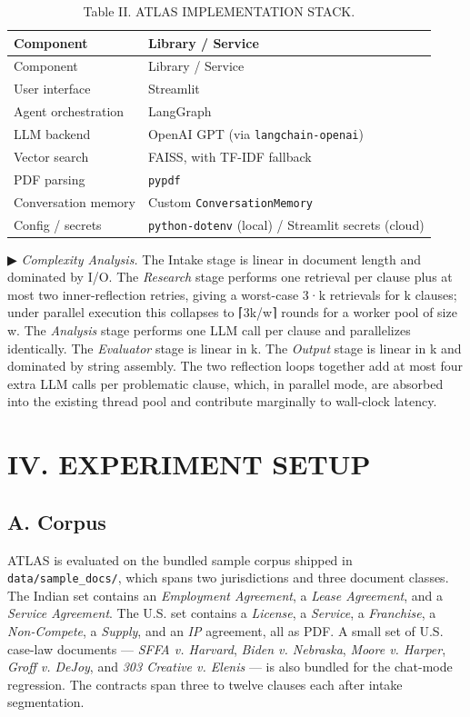 \documentclass[
  twocolumn]{article}
\begin{document}
\begin{longtable}[]{@{}ll@{}}
\caption{Table II. ATLAS IMPLEMENTATION STACK.}\tabularnewline
\toprule\noalign{}
Component & Library / Service \\
\midrule\noalign{}
\endfirsthead
\toprule\noalign{}
Component & Library / Service \\
\midrule\noalign{}
\endhead
\bottomrule\noalign{}
\endlastfoot
User interface & Streamlit \\
Agent orchestration & LangGraph \\
LLM backend & OpenAI GPT (via \texttt{langchain-openai}) \\
Vector search & FAISS, with TF-IDF fallback \\
PDF parsing & \texttt{pypdf} \\
Conversation memory & Custom \texttt{ConversationMemory} \\
Config / secrets & \texttt{python-dotenv} (local) / Streamlit secrets
(cloud) \\
\end{longtable}

▶ \emph{Complexity Analysis.} The Intake stage is linear in document
length and dominated by I/O. The \emph{Research} stage performs one
retrieval per clause plus at most two inner-reflection retries, giving a
worst-case 3·k retrievals for k clauses; under parallel execution this
collapses to ⌈3k/w⌉ rounds for a worker pool of size w. The
\emph{Analysis} stage performs one LLM call per clause and parallelizes
identically. The \emph{Evaluator} stage is linear in k. The
\emph{Output} stage is linear in k and dominated by string assembly. The
two reflection loops together add at most four extra LLM calls per
problematic clause, which, in parallel mode, are absorbed into the
existing thread pool and contribute marginally to wall-clock latency.

\section{IV. EXPERIMENT SETUP}\label{iv.-experiment-setup}

\subsection{A. Corpus}\label{a.-corpus}

ATLAS is evaluated on the bundled sample corpus shipped in
\texttt{data/sample\_docs/}, which spans two jurisdictions and three
document classes. The Indian set contains an \emph{Employment
Agreement}, a \emph{Lease Agreement}, and a \emph{Service Agreement}.
The U.S. set contains a \emph{License}, a \emph{Service}, a
\emph{Franchise}, a \emph{Non-Compete}, a \emph{Supply}, and an
\emph{IP} agreement, all as PDF. A small set of U.S. case-law documents
--- \emph{SFFA v. Harvard}, \emph{Biden v. Nebraska}, \emph{Moore v.
Harper}, \emph{Groff v. DeJoy}, and \emph{303 Creative v. Elenis} --- is
also bundled for the chat-mode regression. The contracts span three to
twelve clauses each after intake segmentation.
\end{document}
